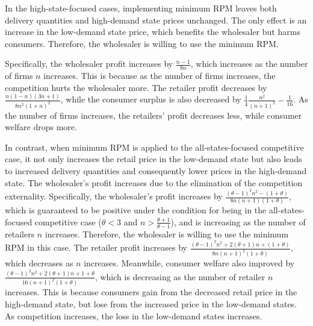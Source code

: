 \documentclass[12pt]{article}
\begin{document}
In the high-state-focused cases, implementing minimum RPM leaves both delivery quantities and high-demand state prices unchanged. The only effect is an increase in the low-demand state price, which benefits the wholesaler but harms consumers. Therefore, the wholesaler is willing to use the minimum RPM. 

Specifically, the wholesaler profit increases by $\frac{n -1}{8n}$, which increases as the number of firms $n$ increases. This is because as the number of firms increases, the competition hurts the wholesaler more. The retailer profit  decreases by $\frac{n(1 - n)(3n + 1)}{8n^2(1+n)^2}$, while the consumer surplus is also decreased by $\frac{1}{4}\frac{n^2}{(n+1)^2} - \frac{1}{16}$. As the number of firms increases, the retailers' profit decreases less, while consumer welfare drops more.  


In contrast, when minimum RPM is applied to the all-states-focused competitive case, it not only increases the retail price in the low-demand state but also leads to increased delivery quantities and consequently lower prices in the high-demand state. The wholesaler's profit increases due to the elimination of the competition externality. Specifically, the wholesaler's profit increases by $\frac{(\theta - 1)^2n^2 - (1+\theta)}{8n(n+1)(1+\theta)}$, which is guaranteed to be positive under the condition for being in the all-states-focused competitive case ($\theta < 3$ and $n > \frac{\theta + 1}{\theta - 1}$), and is increasing as the number of retailers $n$ increases. Therefore, the wholesaler is willing to use the minimum RPM in this case. The retailer profit increases by $\frac{(\theta - 1)^2n^2 + 2(\theta + 1)n + (1 + \theta)}{8n(n+1)^2(1+\theta)}$, which decreases as $n$ increases. Meanwhile, consumer welfare also improved by $\frac{(\theta - 1)^2n^2 + 2(\theta + 1)n + 1 + \theta}{16(n+1)^2(1+ \theta)}$, which is decreasing as the number of retailer $n$ increases. This is because consumers gain from the decreased retail price in the high-demand state, but lose from the increased price in the low-demand states. As competition increases, the loss in the low-demand states increases. 




\end{document}
